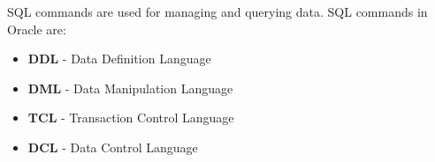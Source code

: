 \setlength{\columnsep}{3pt}
\begin{flushleft}
	
		SQL commands are used for managing and querying data. SQL commands in Oracle are:
		
		\begin{itemize}
			\item \textbf{DDL} - Data Definition Language
			\item \textbf{DML} - Data Manipulation Language
			\item \textbf{TCL} - Transaction Control Language
			\item \textbf{DCL} - Data Control Language
		\end{itemize}
	
\end{flushleft}

\newpage

